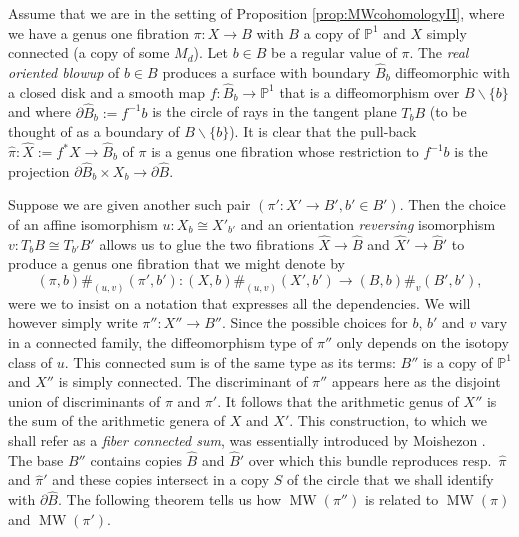 \documentclass[10pt,letterpaper]{amsart}
\numberwithin{equation}{section}
\def\PP{{\mathbb P}}
\def\ssm{\smallsetminus}
\newcommand{\p}{\partial}
\newcommand\MW{\operatorname{MW}}
\theoremstyle{remark}
\begin{document}
Assume that we are in the setting of  Proposition \ref{prop:MWcohomologyII}, where we have a genus one fibration  $\pi: X\to B$ with $B$ a copy of $\PP^1$ and $X$ simply connected (a copy of some $M_d$). Let $b\in B$ be a regular value of $\pi$. The \emph{real oriented blowup} of $b\in B$ produces a surface with boundary $\hat B_b$ diffeomorphic with a closed disk and a smooth map $f: \hat B_b\to \PP^1$ that is a diffeomorphism over $B\ssm \{b\}$ and where 
$\p\hat B_b:=f^{-1}b$  is the circle of rays in the tangent plane $T_b B$ (to be thought of as a boundary of $B\ssm\{b\}$). It is clear that the pull-back $\hat\pi: \hat X:=f^*X\to \hat  B_b$ of $\pi$ is a genus one fibration whose restriction to $f^{-1}b$ is the projection $\p\hat  B_b\times X_b\to \p\hat B$. 



Suppose we are given another such pair 
$(\pi': X'\to B', b'\in B')$. Then the choice of  an affine isomorphism $u: X_b\cong X'_{b'}$ and an orientation \emph{reversing} isomorphism $v:T_bB\cong T_{b'}B'$ allows us to glue the two fibrations  
$\hat X\to \hat B$ and  $\hat X'\to \hat B'$ to produce a genus one fibration that we might denote by 
\[
(\pi,b)\#_{(u,v)} (\pi',b'): (X,b)\#_{(u,v)}(X',b')\to (B,b)\#_v (B',b'), 
\]
were we to insist on a notation that  expresses all the dependencies.
We will however simply write $\pi'': X''\to B''$.
Since the possible choices for $b$, $b'$ and $v$ vary in a connected family, the diffeomorphism type of $\pi''$ only depends on  the isotopy class of $u$. This connected sum is of the same type as its terms: $ B''$ is a copy of $\PP^1$ and $X''$ is simply connected. The discriminant of $\pi''$  appears here as the disjoint union of discriminants of $\pi$ and $\pi'$. It follows that the
arithmetic genus of $X''$ is the sum of the arithmetic genera of $X$ and $X'$. This construction, to which we shall refer  as a \emph{fiber connected sum}, was essentially introduced by Moishezon \cite{M}. 
The base $B''$ contains copies $\hat B$ and  $\hat B'$ over which this bundle reproduces  resp.\  $\hat\pi$ and  $\hat\pi'$ and these copies intersect in a copy $S$ of the circle that we shall identify with $\p\hat B$. 
The following theorem tells us how   $\MW(\pi'')$ is related to $\MW(\pi)$ and $\MW(\pi')$. 
\end{document}
